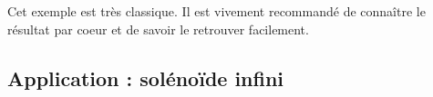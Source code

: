 \documentclass[11pt,fleqn]{book} %
\newcommand{\dd}{\mathrm{d}}
\begin{document}

\begin{remark}
    Cet exemple est très classique. Il est vivement recommandé de connaître le résultat par coeur et de savoir le retrouver facilement.
\end{remark}

\subsection{Application : solénoïde infini}
\end{document}
